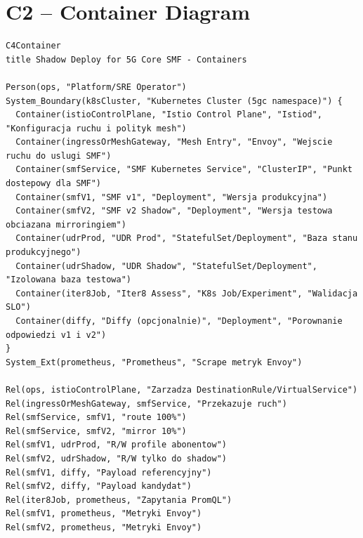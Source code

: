 \section{C2 -- Container Diagram}
\begin{lstlisting}[basicstyle=\footnotesize\ttfamily,caption=C2 Container Diagram w Mermaid,label=lst:c2-mermaid]
C4Container
title Shadow Deploy for 5G Core SMF - Containers

Person(ops, "Platform/SRE Operator")
System_Boundary(k8sCluster, "Kubernetes Cluster (5gc namespace)") {
  Container(istioControlPlane, "Istio Control Plane", "Istiod", "Konfiguracja ruchu i polityk mesh")
  Container(ingressOrMeshGateway, "Mesh Entry", "Envoy", "Wejscie ruchu do uslugi SMF")
  Container(smfService, "SMF Kubernetes Service", "ClusterIP", "Punkt dostepowy dla SMF")
  Container(smfV1, "SMF v1", "Deployment", "Wersja produkcyjna")
  Container(smfV2, "SMF v2 Shadow", "Deployment", "Wersja testowa obciazana mirroringiem")
  Container(udrProd, "UDR Prod", "StatefulSet/Deployment", "Baza stanu produkcyjnego")
  Container(udrShadow, "UDR Shadow", "StatefulSet/Deployment", "Izolowana baza testowa")
  Container(iter8Job, "Iter8 Assess", "K8s Job/Experiment", "Walidacja SLO")
  Container(diffy, "Diffy (opcjonalnie)", "Deployment", "Porownanie odpowiedzi v1 i v2")
}
System_Ext(prometheus, "Prometheus", "Scrape metryk Envoy")

Rel(ops, istioControlPlane, "Zarzadza DestinationRule/VirtualService")
Rel(ingressOrMeshGateway, smfService, "Przekazuje ruch")
Rel(smfService, smfV1, "route 100%")
Rel(smfService, smfV2, "mirror 10%")
Rel(smfV1, udrProd, "R/W profile abonentow")
Rel(smfV2, udrShadow, "R/W tylko do shadow")
Rel(smfV1, diffy, "Payload referencyjny")
Rel(smfV2, diffy, "Payload kandydat")
Rel(iter8Job, prometheus, "Zapytania PromQL")
Rel(smfV1, prometheus, "Metryki Envoy")
Rel(smfV2, prometheus, "Metryki Envoy")
\end{lstlisting}


